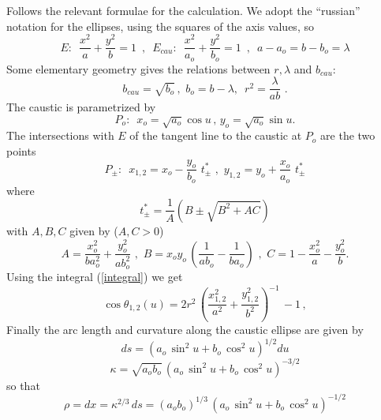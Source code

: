 \documentclass[11pt]{article}
\begin{document}
\noindent Follows the relevant formulae for the calculation.  We adopt  the ``russian'' notation for the ellipses,  using  the squares of the axis values, so
$$  E:\,\,\, \frac{x^2}{a} +  \frac{y^2}{b} = 1\,\,\, ,\,\,\,  E_{cau}:\,\,\,  \frac{x^2}{a_o} +  \frac{y^2}{b_o} = 1\,\,\, ,\,\,\,  a - a_o =  b - b_o = \lambda
$$
Some elementary geometry gives the relations between $r, \lambda $ and $b_{cau}$:
\begin{equation}  b_{cau} = \sqrt{b_o}\,,\,\, b_o = b - \lambda,\,\,\,  r^2 =  \frac{\lambda}{ab} \,\,. 
\end{equation}
The caustic is parametrized by  
$$  P_o:\,\,\,   x_o = \sqrt{a_o} \cos u\,,\, y_o = \sqrt{a_o} \sin u.
$$ 
The intersections with $E$ of the tangent line to the caustic  at $P_o$ are  the two points
\begin{equation}   P_{\pm} :    \,\,\,   x_{1,2} = x_o -  \frac{y_o}{b_o} \,\, t^*_{\pm} \,\,,\,\, y_{1,2} = y_o +  \frac{x_o}{a_o} \,\, t^*_{\pm}
\end{equation} 
where
\begin{equation} t^*_{\pm}  =  \frac{1}{A} \left(  B \pm  \sqrt{B^2 + AC}  \right)  
\end{equation}
with  $A, B, C $ given by     ($A, C > 0$)
\begin{equation}    A = \frac{x_o^2}{b a_o^2} +  \frac{y_o^2}{a b_o^2}\,\,,\,\,  B = x_o y_o \, (\frac{1}{a b_o} -  \frac{1}{b a_o}  )\,\,,\,\,
C = 1 -  \frac{x_o^2}{a} -  \frac{y_o^2}{b}  .
\end{equation} 
Using   the integral  (\ref{integral}) we get
\begin{equation} 
\cos \theta_{1,2} (u) =   2 r^2 \, \left( \frac{x_{1,2}^2}{a^2}  + \frac{y_{1,2}^2}{b^2}  \right)^{-1} \, -   1 \, ,
\end{equation} 
Finally the arc length and curvature along the caustic ellipse are given by
$$ ds =  \left( a_o \, \sin^2 u + b_o \,  \cos^2 u       \right)^{1/2} du
$$ 
$$   \kappa = \sqrt{a_o b_o} \, \left( a_o \, \sin^2 u + b_o \,  \cos^2 u       \right)^{-3/2}
$$ 
so that
\begin{equation}
\rho = dx =  \kappa^{2/3}\, ds =   (a_o b_o)^{1/3} \, \left( a_o \, \sin^2 u + b_o \,  \cos^2 u       \right)^{-1/2}
\end{equation}
\end{document}
